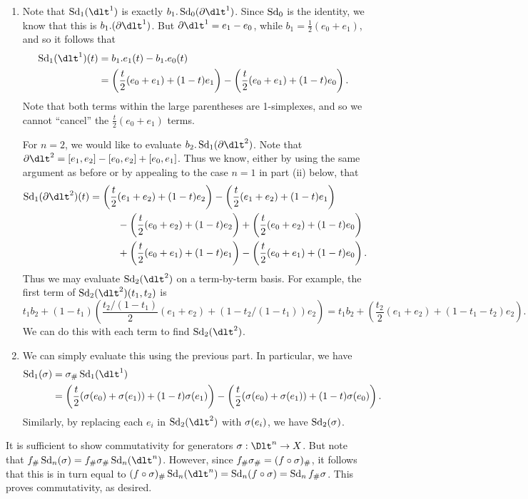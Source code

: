 \documentclass[../../solutions.tex]{subfiles}
\begin{document}
\begin{exercise} \leavevmode
\begin{enumerate}
\item
Note that $\Sd_1(\dlt^1)$ is exactly $b_1.\Sd_0(\partial\dlt^1)$.
Since $\operatorname{Sd}_0$ is the identity, we know that this is $b_1.(\partial\dlt^1)$.
But $\partial\dlt^1=e_1-e_0$, while $b_1=\frac{1}{2}(e_0+e_1)$, and so it follows that
\begin{align*}
\Sd_1(\dlt^1)(t)&=b_1.e_1(t)-b_1.e_0(t)\\
&=\left(\frac t2(e_0+e_1)+(1-t)e_1\right)-\left(\frac t2(e_0+e_1)+(1-t)e_0\right).
\end{align*}
Note that both terms within the large parentheses are 1-simplexes, and so we cannot ``cancel'' the $\frac t2(e_0+e_1)$ terms.

For $n=2$, we would like to evaluate $b_2.\Sd_1(\partial\dlt^2)$.
Note that $\partial\dlt^2=[e_1,e_2]-[e_0,e_2]+[e_0,e_1]$.
Thus we know, either by using the same argument as before or by appealing to the case $n=1$ in part (ii) below, that
\begin{align*}
\Sd_1(\partial\dlt^2)(t)=\bigg(\frac t2&(e_1+e_2)+(1-t)e_2\bigg)-\left(\frac t2(e_1+e_2)+(1-t)e_1\right)\\
&-\left(\frac t2(e_0+e_2)+(1-t)e_2\right)+\left(\frac t2(e_0+e_2)+(1-t)e_0\right)\\
&+\left(\frac t2(e_0+e_1)+(1-t)e_1\right)-\left(\frac t2(e_0+e_1)+(1-t)e_0\right).
\end{align*}
Thus we may evaluate $\Sd_2(\dlt^2)$ on a term-by-term basis.
For example, the first term of $\Sd_2(\dlt^2)(t_1,t_2)$ is
\[t_1b_2+(1-t_1)\left(\frac{t_2/(1-t_1)}{2}(e_1+e_2)+(1-t_2/(1-t_1))e_2\right)=t_1b_2+\left(\frac{t_2}2(e_1+e_2)+(1-t_1-t_2)e_2\right).\]
We can do this with each term to find $\Sd_2(\dlt^2)$.
\item
We can simply evaluate this using the previous part.
In particular, we have
\begin{align*}
\Sd_1(\sig)&=\sig_\#\Sd_1(\dlt^1)\\
&=\left(\frac t2(\sig(e_0)+\sig(e_1))+(1-t)\sig(e_1)\right)-\left(\frac t2(\sig(e_0)+\sig(e_1))+(1-t)\sig(e_0)\right).
\end{align*}
Similarly, by replacing each $e_i$ in $\Sd_2(\dlt^2)$ with $\sigma(e_i)$, we have $\operatorname{Sd}_2(\sigma)$.
\end{enumerate}
\end{exercise}

\begin{exercise} \leavevmode
It is sufficient to show commutativity for generators $\sig:\Dlt^n\to X$.
But note that $f_\#\Sd_n(\sig)=f_\#\sig_\#\Sd_n(\dlt^n)$.
However, since $f_\#\sigma_\#=(f\circ\sigma)_\#$, it follows that this is in turn equal to $(f\circ\sig)_\#\Sd_n(\dlt^n)=\Sd_n(f\circ\sig)=\Sd_nf_\#\sig$.
This proves commutativity, as desired.
\end{exercise}
\end{document}
